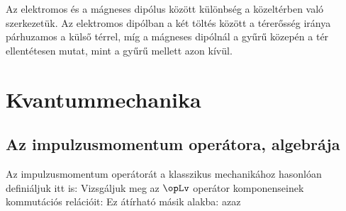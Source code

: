    Az elektromos és a mágneses dipólus között különbség a közeltérben való szerkezetük.
   Az elektromos dipólban a két töltés között a térerősség iránya párhuzamos a külső térrel, míg a mágneses dipólnál a gyűrű közepén a tér ellentétesen mutat, mint a gyűrű mellett azon kívül.

 \section{Kvantummechanika}
  
  \subsection{Az impulzusmomentum operátora, algebrája}
  
   Az impulzusmomentum operátorát a klasszikus mechanikához hasonlóan definiáljuk itt is:
   Vizsgáljuk meg az $\opLv$ operátor komponenseinek kommutációs relációit:
   Ez átírható másik alakba:
   azaz
   
